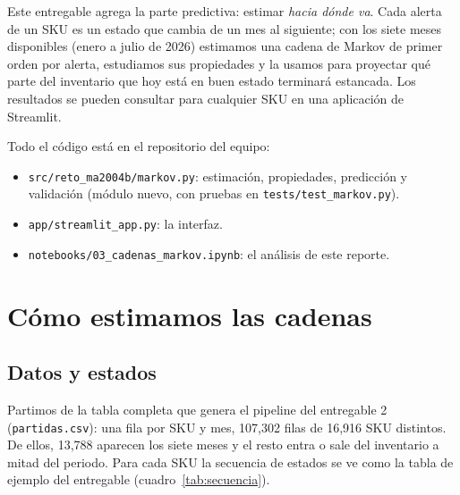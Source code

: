 \documentclass[11pt,letterpaper]{article}
\begin{document}
Este entregable agrega la parte predictiva: estimar \emph{hacia dónde va}. Cada alerta de un SKU es un estado que cambia de un mes al siguiente; con los siete meses disponibles (enero a julio de 2026) estimamos una cadena de Markov de primer orden por alerta, estudiamos sus propiedades y la usamos para proyectar qué parte del inventario que hoy está en buen estado terminará estancada. Los resultados se pueden consultar para cualquier SKU en una aplicación de Streamlit.

Todo el código está en el repositorio del equipo:
\begin{itemize}
  \item \texttt{src/reto\_ma2004b/markov.py}: estimación, propiedades, predicción y validación (módulo nuevo, con pruebas en \texttt{tests/test\_markov.py}).
  \item \texttt{app/streamlit\_app.py}: la interfaz.
  \item \texttt{notebooks/03\_cadenas\_markov.ipynb}: el análisis de este reporte.
\end{itemize}

\section{Cómo estimamos las cadenas}

\subsection{Datos y estados}

Partimos de la tabla completa que genera el pipeline del entregable 2 (\texttt{partidas.csv}): una fila por SKU y mes, 107,302 filas de 16,916 SKU distintos. De ellos, 13,788 aparecen los siete meses y el resto entra o sale del inventario a mitad del periodo. Para cada SKU la secuencia de estados se ve como la tabla de ejemplo del entregable (cuadro~\ref{tab:secuencia}).
\end{document}
